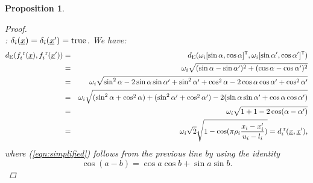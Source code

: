 \documentclass{article}
\newcommand{\vect}[1]{\underline{\smash{#1}}}
\renewcommand{\v}[1]{\vect{#1}}
\newcommand{\br}{^{\text{\textnormal{ r}}}}
\newcommand\transpose{{\textrm{\tiny{\sf{T}}}}}
\newtheorem{prop}[thm]{Proposition}
\begin{document}
\begin{prop}
\begin{proof}
~\\: $\delta_i(\v{x}) = \delta_i(\v{x}') = \textrm{true}$. We have:
\begin{eqnarray}
\nonumber{}d_{\text{E}}(f_i\br(\v{x}),f_i\br(\v{x}')) & = & d_{\text{E}}(\omega_i [\sin{\alpha}, \cos{\alpha}]^\transpose, \omega_i [\sin{\alpha'}, \cos{\alpha'}]^\transpose)\\ 
\nonumber{}& = & \omega_i \sqrt{(\sin{\alpha}-\sin{\alpha'})^2+ (\cos{\alpha}-\cos{\alpha'})^2}\\
\nonumber{}& = & \omega_i \sqrt{\sin^2{\alpha} -2 \sin{\alpha}\sin{\alpha'} + \sin^2{\alpha'}  + \cos^2{\alpha} -2 \cos{\alpha}\cos{\alpha'} + \cos^2{\alpha'} }\\
\nonumber{}& = & \omega_i \sqrt{(\sin^2{\alpha}+\cos^2{\alpha})   +  (\sin^2{\alpha'}+\cos^2{\alpha'})   -2 (\sin{\alpha}\sin{\alpha'} + \cos{\alpha}\cos{\alpha'})}\\
\label{eqn:simplified}& = & \omega_i \sqrt{ 1+1-2 \cos(\alpha-\alpha')}\\
\nonumber& = & \omega_i \sqrt{2} \sqrt{1 - \cos(\pi\rho_i \frac{x_i-x_i'}{u_i-l_i})} = d\br_i(\v{x}, \v{x}'),
\end{eqnarray}
where (\ref{eqn:simplified}) follows from the previous line by using the identity 
\[\cos{(a-b)} = \cos{a}\cos{b} + \sin{a}\sin{b}.\]
\end{proof}
\end{prop}
\end{document}
